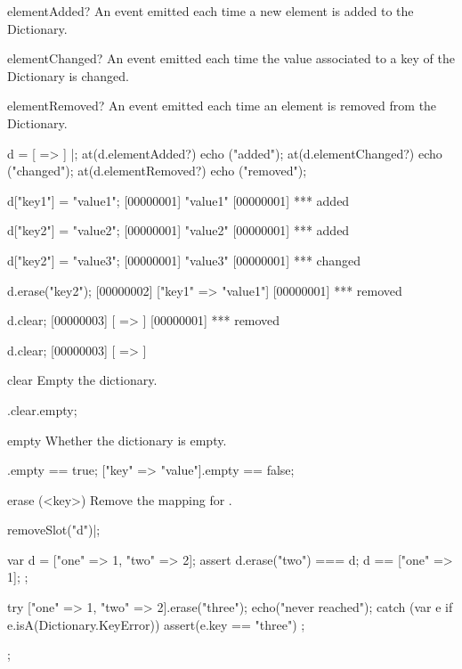 \begin{urbiscriptapi}
\item[elementAdded?] An event emitted each time a new element is added to
  the Dictionary.

\item[elementChanged?] An event emitted each time the value associated to a
  key of the Dictionary is changed.

\item[elementRemoved?] An event emitted each time an element is removed from
  the Dictionary.

\begin{urbiscript}
d = [ => ] |;
at(d.elementAdded?) echo ("added");
at(d.elementChanged?) echo ("changed");
at(d.elementRemoved?) echo ("removed");

d["key1"] = "value1";
[00000001] "value1"
[00000001] *** added

d["key2"] = "value2";
[00000001] "value2"
[00000001] *** added

d["key2"] = "value3";
[00000001] "value3"
[00000001] *** changed

d.erase("key2");
[00000002] ["key1" => "value1"]
[00000001] *** removed

d.clear;
[00000003] [ => ]
[00000001] *** removed

d.clear;
[00000003] [ => ]
\end{urbiscript}

\item[clear]
  Empty the dictionary.

\begin{urbiassert}
["one" => 1].clear.empty;
\end{urbiassert}


\item[empty]
  Whether the dictionary is empty.

\begin{urbiassert}
[=>].empty == true;
["key" => "value"].empty == false;
\end{urbiassert}


\item[erase](<key>) Remove the mapping for .
\begin{urbicomment}
removeSlot("d")|;
\end{urbicomment}
\begin{urbiscript}
{
  var d = ["one" => 1, "two" => 2];
  assert
  {
    d.erase("two") === d;
    d == ["one" => 1];
  };

  try
  {
    ["one" => 1, "two" => 2].erase("three");
    echo("never reached");
  }
  catch (var e if e.isA(Dictionary.KeyError))
  {
    assert(e.key == "three")
  };
};
\end{urbiscript}


\end{urbiscriptapi}
